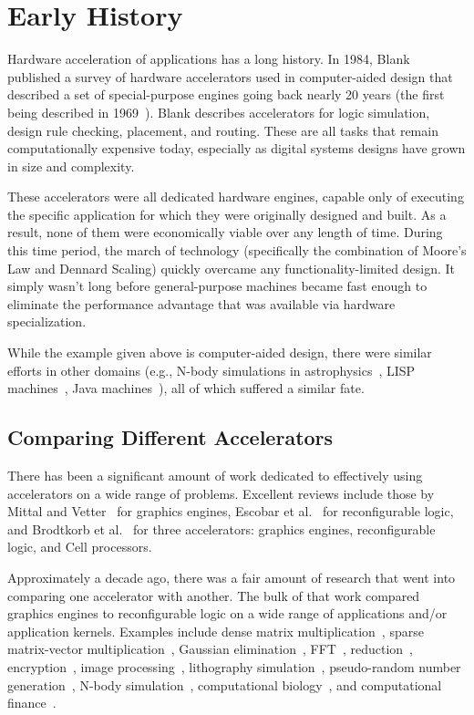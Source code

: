 \section{Early History}
\label{sec:history}

Hardware acceleration of applications has a long history.
In 1984, Blank~\cite{Blank84}
published a survey of hardware accelerators used in computer-aided design 
that described a set of special-purpose engines going back nearly 20 years
(the first being described in 1969~\cite{McKay69}).
Blank describes accelerators for logic simulation, design rule checking,
placement, and routing. These are all tasks that remain computationally
expensive today, especially as digital systems designs have grown in size
and complexity.

These accelerators were all dedicated hardware engines, capable only
of executing the specific application for which they were originally designed
and built. As a result, none of them were economically viable over any
length of time.  During this time period, the march of technology (specifically
the combination of Moore's Law and Dennard Scaling) quickly
overcame any functionality-limited design.  It simply wasn't long
before general-purpose machines became fast enough to eliminate the
performance advantage that was available via hardware specialization.

While the example given above is computer-aided design, there were similar
efforts in other domains (e.g., N-body simulations in astrophysics~\cite{grape},
LISP machines~\cite{lisp,alphalisp},
Java machines~\cite{java,Schoeberl08}),
all of which suffered a similar fate.

\subsection{Comparing Different Accelerators}

There has been a significant amount of work dedicated to effectively
using accelerators on a wide range of problems.  Excellent reviews
include those by Mittal and Vetter~\cite{mv15} for graphics engines,
Escobar et al.~\cite{ecv16} for reconfigurable logic, and
Brodtkorb et al.~\cite{bdh+10} for three accelerators: graphics engines,
reconfigurable logic, and Cell processors.

Approximately a decade ago, there was a fair amount of research that
went into comparing one accelerator with another.  The bulk of that
work compared graphics engines to reconfigurable logic on a wide range
of applications and/or application kernels.
Examples include dense matrix multiplication~\cite{cmhm10,jpbc10},
sparse matrix-vector multiplication~\cite{sww+10},
Gaussian elimination~\cite{cls+08},
FFT~\cite{cmhm10},
reduction~\cite{jpbc10},
encryption~\cite{cls+08},
image processing~\cite{amy09,bnw+10},
lithography simulation~\cite{cz09},
pseudo-random number generation~\cite{jpbc10,tb09,thl09},
N-body simulation~\cite{jpbc10},
computational biology~\cite{cls+08}, and
computational finance~\cite{cmhm10,tb10}.

